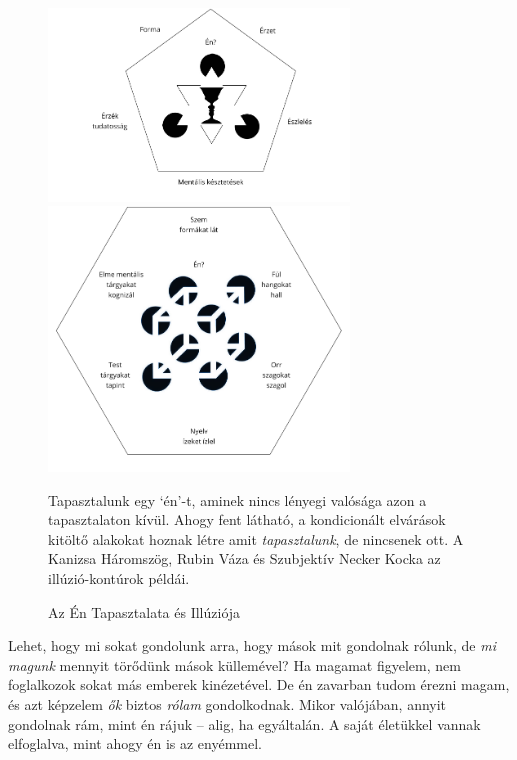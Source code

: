 \begin{figure}[h]
\caption{Az Én Tapasztalata és Illúziója}\label{fig-illusion-of-self}

\centering

\includegraphics[width=80mm]{./manuscript/tex/diagrams/khandhas-self-illusion-hu.pdf}

\bigskip

\includegraphics[width=80mm]{./manuscript/tex/diagrams/senses-self-illusion-hu.pdf}

\bigskip

\begin{minipage}{0.85\linewidth}
\centering\footnotesize
Tapasztalunk egy `én'-t, aminek nincs lényegi valósága azon a tapasztalaton kívül.
Ahogy fent látható, a kondicionált elvárások kitöltő alakokat hoznak létre
amit \emph{tapasztalunk}, de nincsenek ott.
A Kanizsa Háromszög, Rubin Váza és Szubjektív Necker Kocka az illúzió-kontúrok példái.
\end{minipage}

\end{figure}

\vfill\null
\clearpage
\normalpagelayout

Lehet, hogy mi sokat gondolunk arra, hogy mások mit gondolnak rólunk, de
\emph{mi magunk} mennyit törődünk mások küllemével? Ha magamat figyelem,
nem foglalkozok sokat más emberek kinézetével. De én zavarban tudom
érezni magam, és azt képzelem \emph{ők} biztos \emph{rólam}
gondolkodnak. Mikor valójában, annyit gondolnak rám, mint én rájuk --
alig, ha egyáltalán. A saját életükkel vannak elfoglalva, mint ahogy én
is az enyémmel.


